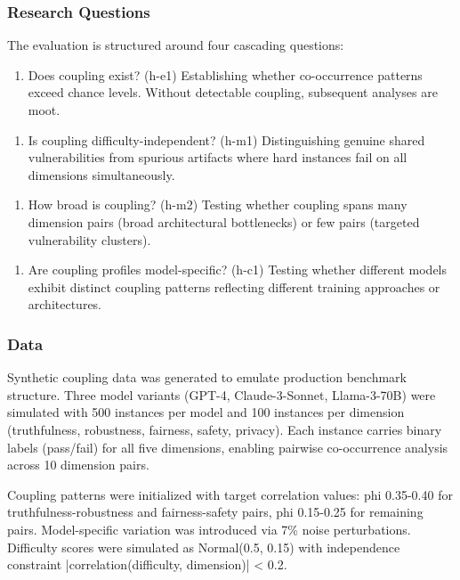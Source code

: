 
\subsubsection{Research Questions}

The evaluation is structured around four cascading questions:

\begin{enumerate}
\item Does coupling exist? (h-e1) Establishing whether co-occurrence patterns exceed chance levels. Without detectable coupling, subsequent analyses are moot.
\end{enumerate}

\begin{enumerate}
\item Is coupling difficulty-independent? (h-m1) Distinguishing genuine shared vulnerabilities from spurious artifacts where hard instances fail on all dimensions simultaneously.
\end{enumerate}

\begin{enumerate}
\item How broad is coupling? (h-m2) Testing whether coupling spans many dimension pairs (broad architectural bottlenecks) or few pairs (targeted vulnerability clusters).
\end{enumerate}

\begin{enumerate}
\item Are coupling profiles model-specific? (h-c1) Testing whether different models exhibit distinct coupling patterns reflecting different training approaches or architectures.
\end{enumerate}

\subsubsection{Data}

Synthetic coupling data was generated to emulate production benchmark structure. Three model variants (GPT-4, Claude-3-Sonnet, Llama-3-70B) were simulated with 500 instances per model and 100 instances per dimension (truthfulness, robustness, fairness, safety, privacy). Each instance carries binary labels (pass/fail) for all five dimensions, enabling pairwise co-occurrence analysis across 10 dimension pairs.

Coupling patterns were initialized with target correlation values: phi 0.35-0.40 for truthfulness-robustness and fairness-safety pairs, phi 0.15-0.25 for remaining pairs. Model-specific variation was introduced via 7\% noise perturbations. Difficulty scores were simulated as Normal(0.5, 0.15) with independence constraint |correlation(difficulty, dimension)| < 0.2.

